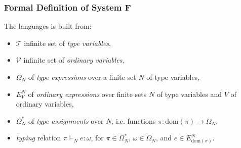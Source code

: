 \begin{frame}[allowframebreaks]
    \frametitle{Formal Definition of System F}

    The languages is built from:
    \begin{itemize}
        \item $\mathcal{T}$ infinite set of \textit{type variables},
        \item $\mathcal{V}$ infinite set of \textit{ordinary variables},
        \item $\Omega_N$ of \textit{type expressions} over a finite set $N$ of type variables,
        \item $E_V^N$ of \textit{ordinary expressions} over finite sets $N$ of type variables and $V$ of ordinary variables,
        \item $\Omega^*_N$ of \textit{type assignments} over $N$, i.e. functions $\pi \colon \mathrm{dom}(\pi) \rightarrow \Omega_N$,
        \item \textit{typing} relation $\pi \vdash_N e \colon \omega$, for $\pi \in \Omega^*_N$, $\omega \in \Omega_N$, and $e \in E^N_{\mathrm{dom}(\pi)}$.
    \end{itemize}
    

\end{frame}
